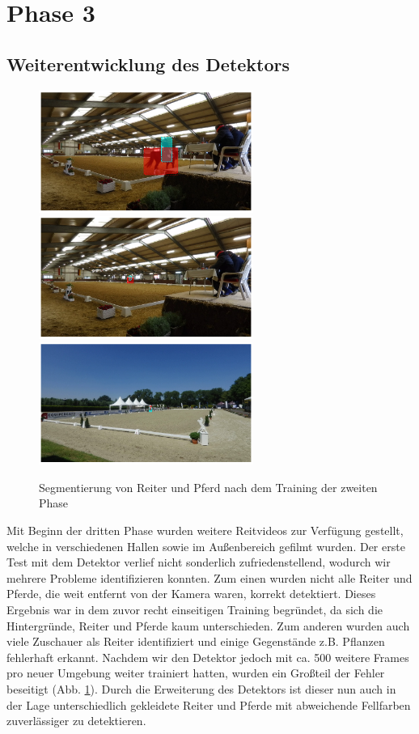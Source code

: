\section{Phase 3}
\subsection*{Weiterentwicklung des Detektors}

\begin{figure}
\centering
\includegraphics[height=4cm,trim={6cm 0 6cm 0},clip]{./img/IndoorMask6.png}
\includegraphics[height=4cm,trim={6cm 0 6cm 0},clip]{./img/IndoorMask3.png}
\includegraphics[height=4cm,trim={6cm 0 6cm 0},clip]{./img/OutdoorMask2.png}
\caption{Segmentierung von Reiter und Pferd nach dem Training der zweiten Phase}
\label{fig:SegmentierungPhase3}
\end{figure}

Mit Beginn der dritten Phase wurden weitere Reitvideos zur Verfügung gestellt, welche in verschiedenen Hallen sowie im Außenbereich gefilmt wurden. Der erste Test mit dem Detektor verlief nicht sonderlich zufriedenstellend, wodurch wir mehrere Probleme identifizieren konnten. Zum einen wurden nicht alle Reiter und Pferde, die weit entfernt von der Kamera waren, korrekt detektiert. Dieses Ergebnis war in dem zuvor recht einseitigen Training begründet, da sich die Hintergründe, Reiter und Pferde kaum unterschieden. Zum anderen wurden auch viele Zuschauer als Reiter identifiziert und einige Gegenstände z.B. Pflanzen  fehlerhaft erkannt. Nachdem wir den Detektor jedoch mit ca. 500 weitere Frames pro neuer Umgebung weiter trainiert hatten, wurden ein Großteil der Fehler beseitigt (Abb. \ref{fig:SegmentierungPhase3}). Durch die Erweiterung des Detektors ist dieser nun auch in der Lage unterschiedlich gekleidete Reiter und Pferde mit abweichende Fellfarben zuverlässiger zu detektieren.


